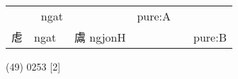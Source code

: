 \documentclass[14pt,a4paper]{scrartcl}
\begin{document}
\begin{longtable}[c]{@{}llllll@{}}
\begin{minipage}[t]{0.14\columnwidth}
\strut\end{minipage} &
\begin{minipage}[t]{0.14\columnwidth}\raggedright\strut
𣡌 ngat
\strut\end{minipage} &
\begin{minipage}[t]{0.14\columnwidth}\raggedright\strut
\strut\end{minipage} &
\begin{minipage}[t]{0.14\columnwidth}\raggedright\strut
pure:A
\strut\end{minipage}\tabularnewline
\begin{minipage}[t]{0.14\columnwidth}\raggedright\strut
䖈
\strut\end{minipage} &
\begin{minipage}[t]{0.14\columnwidth}\raggedright\strut
ngat
\strut\end{minipage} &
\begin{minipage}[t]{0.14\columnwidth}\raggedright\strut
鬳 ngjonH
\strut\end{minipage} &
\begin{minipage}[t]{0.14\columnwidth}\raggedright\strut
\strut\end{minipage} &
\begin{minipage}[t]{0.14\columnwidth}\raggedright\strut
\strut\end{minipage} &
\begin{minipage}[t]{0.14\columnwidth}\raggedright\strut
pure:B
\strut\end{minipage}\tabularnewline
\bottomrule
\end{longtable}

(49) 0253 {[}2{]}
\end{document}
